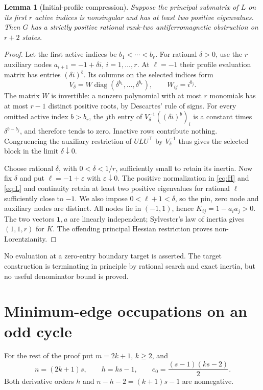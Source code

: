 \documentclass[11pt]{article}
\newtheorem{lemma}[theorem]{Lemma}
\theoremstyle{remark}\newtheorem{remark}[theorem]{Remark}
\DeclareMathOperator{\diag}{diag}
\newcommand{\one}{\mathbf 1}
\begin{document}
\begin{lemma}[Initial-profile compression]\label{lem:compression}
Suppose the principal submatrix of $L$ on its first $r$ active
indices is nonsingular and has at least two positive eigenvalues.
Then $G$ has a strictly positive rational rank-two
antiferromagnetic obstruction on $r+2$ states.
\end{lemma}
\begin{proof}
Let the first active indices be $b_1<\cdots<b_r$. For rational
$\delta>0$, use the $r$ auxiliary nodes $a_{i+1}=-1+\delta i$,
$i=1,\ldots,r$. At $\ell=-1$ their profile evaluation matrix
has entries $(\delta i)^b$. Its columns on the selected indices
form
\[
 V_\delta=W\diag(\delta^{b_1},\ldots,\delta^{b_r}),
 \qquad W_{ij}=i^{b_j}.
\]
The matrix $W$ is invertible: a nonzero polynomial with at most
$r$ monomials has at most $r-1$ distinct positive roots, by
Descartes' rule of signs. For every omitted active index $b>b_r$,
the $j$th entry of $V_\delta^{-1}((\delta i)^b)_i$ is a constant
times $\delta^{b-b_j}$, and therefore tends to zero.
Inactive rows contribute nothing. Congruencing the auxiliary
restriction of $ULU^\top$ by $V_\delta^{-1}$ thus gives the selected
block in the limit $\delta\downarrow0$.

Choose rational $\delta$, with $0<\delta<1/r$, sufficiently small
to retain its inertia. Now fix $\delta$ and put
$\ell=-1+\varepsilon$ with $\varepsilon\downarrow0$.
The positive normalization in \eqref{eq:H} and \eqref{eq:L}
and continuity retain at least two positive eigenvalues for
rational $\ell$ sufficiently close to $-1$.
We also impose $0<\ell+1<\delta$, so the pin, zero node and
auxiliary nodes are distinct. All nodes lie in $(-1,1)$, hence
$K_{ij}=1-a_i a_j>0$.
The two vectors $\one,a$ are linearly independent; Sylvester's
law of inertia gives $(1,1,r)$ for $K$.
The offending principal Hessian restriction proves non-Lorentzianity.
\end{proof}
No evaluation at a zero-entry boundary target is asserted.
The target construction is terminating in principle by rational
search and exact inertia, but no useful denominator bound is proved.

\section{Minimum-edge occupations on an odd cycle}
For the rest of the proof put $m=2k+1$, $k\ge2$, and
\begin{equation}
 n=(2k+1)s,\qquad h=ks-1,\qquad
 e_0=\frac{(s-1)(ks-2)}2.                              \label{eq:parameters}
\end{equation}
Both derivative orders $h$ and $n-h-2=(k+1)s-1$ are nonnegative.
\end{document}
